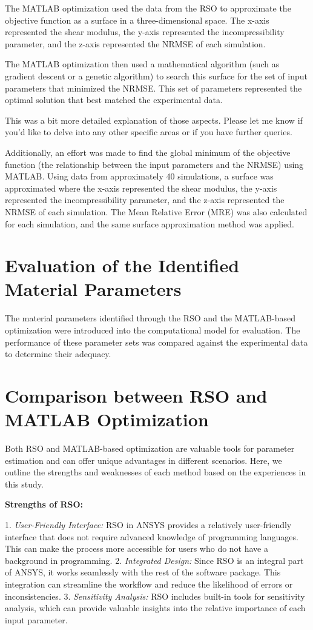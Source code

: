 The MATLAB optimization used the data from the RSO to approximate the objective function as a surface in a three-dimensional space. The x-axis represented the shear modulus, the y-axis represented the incompressibility parameter, and the z-axis represented the NRMSE of each simulation.

The MATLAB optimization then used a mathematical algorithm (such as gradient descent or a genetic algorithm) to search this surface for the set of input parameters that minimized the NRMSE. This set of parameters represented the optimal solution that best matched the experimental data.

This was a bit more detailed explanation of those aspects. Please let me know if you'd like to delve into any other specific areas or if you have further queries.


Additionally, an effort was made to find the global minimum of the objective function (the relationship between the input parameters and the NRMSE) using MATLAB. Using data from approximately 40 simulations, a surface was approximated where the x-axis represented the shear modulus, the y-axis represented the incompressibility parameter, and the z-axis represented the NRMSE of each simulation. The Mean Relative Error (MRE) was also calculated for each simulation, and the same surface approximation method was applied.

\section{Evaluation of the Identified Material Parameters}

The material parameters identified through the RSO and the MATLAB-based optimization were introduced into the computational model for evaluation. The performance of these parameter sets was compared against the experimental data to determine their adequacy.


\section{Comparison between RSO and MATLAB Optimization}

Both RSO and MATLAB-based optimization are valuable tools for parameter estimation and can offer unique advantages in different scenarios. Here, we outline the strengths and weaknesses of each method based on the experiences in this study.

\textbf{Strengths of RSO:}

	1. \textit{User-Friendly Interface:} RSO in ANSYS provides a relatively user-friendly interface that does not require advanced knowledge of programming languages. This can make the process more accessible for users who do not have a background in programming.
	2. \textit{Integrated Design:} Since RSO is an integral part of ANSYS, it works seamlessly with the rest of the software package. This integration can streamline the workflow and reduce the likelihood of errors or inconsistencies.
	3. \textit{Sensitivity Analysis:} RSO includes built-in tools for sensitivity analysis, which can provide valuable insights into the relative importance of each input parameter.

